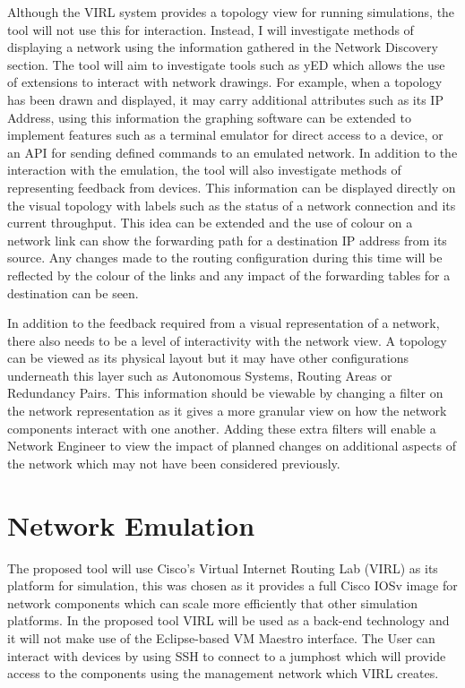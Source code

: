 \documentclass[11pt]{report}
\begin{document}
Although the VIRL system provides a topology view for running simulations, the tool will not use this for interaction. Instead, I will investigate methods of displaying a network using the information gathered in the Network Discovery section. The tool will aim to investigate tools such as yED which allows the use of extensions to interact with network drawings. For example, when a topology has been drawn and displayed, it may carry additional attributes such as its IP Address, using this information the graphing software can be extended to implement features such as a terminal emulator for direct access to a device, or an API for sending defined commands to an emulated network. In addition to the interaction with the emulation, the tool will also investigate methods of representing feedback from devices. This information can be displayed directly on the visual topology with labels such as the status of a network connection and its current throughput. This idea can be extended and the use of colour on a network link can show the forwarding path for a destination IP address from its source. Any changes made to the routing configuration during this time will be reflected by the colour of the links and any impact of the forwarding tables for a destination can be seen.

In addition to the feedback required from a visual representation of a network, there also needs to be a level of interactivity with the network view. A topology can be viewed as its physical layout but it may have other configurations underneath this layer such as Autonomous Systems, Routing Areas or Redundancy Pairs. This information should be viewable by changing a filter on the network representation as it gives a more granular view on how the network components interact with one another. Adding these extra filters will enable a Network Engineer to view the impact of planned changes on additional aspects of the network which may not have been considered previously.

\section{Network Emulation}

The proposed tool will use Cisco's Virtual Internet Routing Lab (VIRL) as its platform for simulation, this was chosen as it provides a full Cisco IOSv image for network components which can scale more efficiently that other simulation platforms. In the proposed tool VIRL will be used as a back-end technology and it will not make use of the Eclipse-based VM Maestro interface. The User can interact with devices by using SSH to connect to a jumphost which will provide access to the components using the management network which VIRL creates. 
\end{document}
